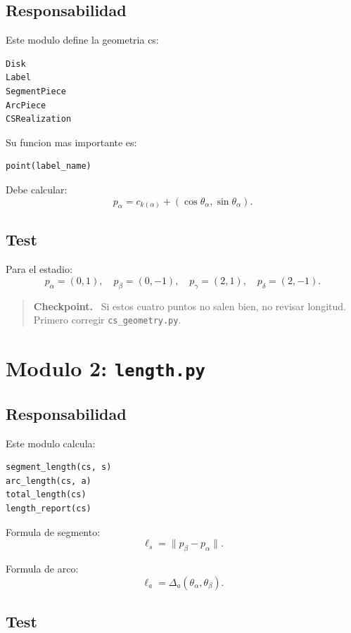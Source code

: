 \documentclass[11pt,letterpaper]{amsart}
\newenvironment{checkpoint}
{\par\medskip\noindent\begin{quote}\textbf{Checkpoint.}\ }
{\end{quote}\par\medskip}
\begin{document}
\subsection{Responsabilidad}

Este modulo define la geometria cs:

\begin{verbatim}
Disk
Label
SegmentPiece
ArcPiece
CSRealization
\end{verbatim}

Su funcion mas importante es:

\begin{verbatim}
point(label_name)
\end{verbatim}

Debe calcular:
\[
p_\alpha=c_{k(\alpha)}+(\cos\theta_\alpha,\sin\theta_\alpha).
\]

\subsection{Test}

Para el estadio:
\[
p_\alpha=(0,1),
\quad
p_\beta=(0,-1),
\quad
p_\gamma=(2,1),
\quad
p_\delta=(2,-1).
\]

\begin{checkpoint}
Si estos cuatro puntos no salen bien, no revisar longitud. Primero corregir
\texttt{cs\_geometry.py}.
\end{checkpoint}

\section{Modulo 2: \texttt{length.py}}

\subsection{Responsabilidad}

Este modulo calcula:

\begin{verbatim}
segment_length(cs, s)
arc_length(cs, a)
total_length(cs)
length_report(cs)
\end{verbatim}

Formula de segmento:
\[
\ell_s=\|p_\beta-p_\alpha\|.
\]

Formula de arco:
\[
\ell_a=\Delta_a(\theta_\alpha,\theta_\beta).
\]

\subsection{Test}
\end{document}
